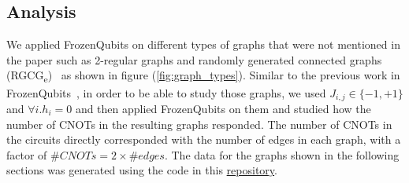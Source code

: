 \subsection{Analysis}\label{research:analysis}
We applied FrozenQubits on different types of graphs that were not mentioned in the paper such as 2-regular graphs and randomly generated connected graphs (RGCG\textsubscript{e})~\cite{RGCG} as shown in figure (\ref{fig:graph_types}). Similar to the previous work in FrozenQubits~\cite{frozenqubits}, in order to be able to study those graphs, we used $J_{i,j}\in \{-1,+1\}$ and $\forall i.h_i=0$ and then applied FrozenQubits on them and studied how the number of CNOTs in the resulting graphs responded. The number of CNOTs in the circuits directly corresponded with the number of edges in each graph, with a factor of $\#CNOTs=2\times \#edges$. The data for the graphs shown in the following sections was generated using the code in this \href{https://github.com/leoschultheiss/FrozenQubitsImplementation}{repository}.
